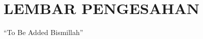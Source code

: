 \chapter*{\uppercase{LEMBAR PENGESAHAN}}
\vspace{1cm}

\begin{center}
    ``To Be Added Bismillah''
\end{center}

\newpage
